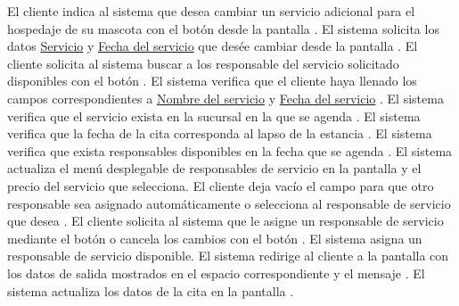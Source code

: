 \begin{UCtrayectoria}
	\UCpaso[] El cliente indica al sistema que desea cambiar un servicio adicional para el hospedaje de su mascota con el botón  desde la pantalla .
	\UCpaso[] \label{UC8.IntroduceDatosCita} El sistema solicita los datos \hyperlink{CATALOGO_SERVICIOS.Nombre_servicio}{Servicio} y \hyperlink{CITA.Fecha}{Fecha del servicio} que desée cambiar desde la pantalla .
	\UCpaso[] El cliente solicita al sistema buscar a los responsable del servicio solicitado disponibles con el botón .
	\UCpaso[] El sistema verifica que el cliente haya llenado los campos correspondientes a \hyperlink{CATALOGO_SERVICIOS.Nombre_servicio}{Nombre del servicio} y \hyperlink{CITA.Fecha}{Fecha del servicio}  .
	\UCpaso[] El sistema verifica que el servicio exista en la sucursal en la que se agenda  .
	\UCpaso[] El sistema verifica que la fecha de la cita corresponda al lapso de la estancia  .
	\UCpaso[] El sistema verifica que exista responsables disponibles en la fecha que se agenda  .
	\UCpaso[] El sistema actualiza el menú desplegable de responsables de servicio en la pantalla  y el precio del servicio que selecciona.
	\UCpaso[] \label{UC7.IntroduceResponsableServicio} El cliente deja vacío el campo para que otro responsable sea asignado automáticamente o selecciona al responsable de servicio que desea .
	\UCpaso[] El cliente solicita al sistema que le asigne un responsable de servicio mediante el botón  o cancela los cambios con el botón  .
	\UCpaso[] El sistema asigna un responsable de servicio disponible.
	\UCpaso[] El sistema redirige al cliente a la pantalla  con los datos de salida mostrados en el espacio correspondiente y el mensaje .
	\UCpaso[] El sistema actualiza los datos de la cita en la pantalla .
\end{UCtrayectoria}

